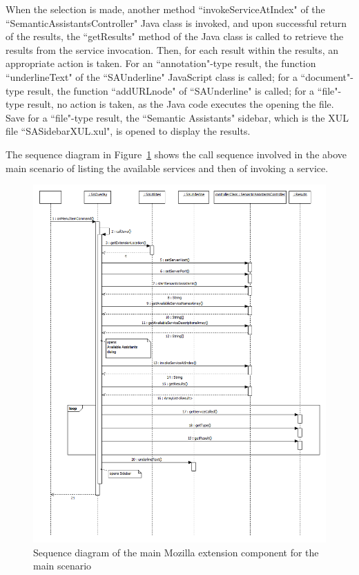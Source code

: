 When the selection is made, another method ``invokeServiceAtIndex" of the ``SemanticAssistantsController" Java class is invoked, and upon successful return of the results, the ``getResults" method of the Java class is called to retrieve the results from the service invocation. Then, for each result within the results, an appropriate action is taken. For an ``annotation"-type result, the function ``underlineText" of the ``SAUnderline" JavaScript class is called; for a ``document"-type result, the function ``addURLnode" of ``SAUnderline" is called; for a ``file"-type result, no action is taken, as the Java code executes the opening the file. Save for a ``file"-type result, the ``Semantic Assistants" sidebar, which is the XUL file ``SASidebarXUL.xul", is opened to display the results. 

The sequence diagram in Figure~\ref{fig:mozilla_development_notes_mozilla_extension_sequence_diagram_main_scenario} shows the call sequence involved in the above main scenario of listing the available services and then of invoking a service. 
\begin{figure}[htb]
  \centering
  \includegraphics[totalheight=0.8\textheight]{pictures/mozilla_development_notes_mozilla_extension_sequence_diagram_main_scenario.png}
  \caption{Sequence diagram of the main Mozilla extension component for the main scenario}
  \label{fig:mozilla_development_notes_mozilla_extension_sequence_diagram_main_scenario}
\end{figure}


